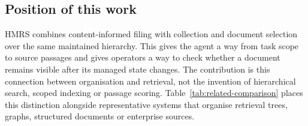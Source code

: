 \subsection{Position of this work}
\label{sec:gap}

HMRS combines content-informed filing with collection and document
selection over the same maintained hierarchy. This gives the agent a way
from task scope to source passages and gives operators a way to check
whether a document remains visible after its managed state changes. The
contribution is this connection between organisation and retrieval, not the
invention of hierarchical search, scoped indexing or passage scoring. Table~\ref{tab:related-comparison}
places this distinction alongside representative systems that organise
retrieval trees, graphs, structured documents or enterprise sources.
